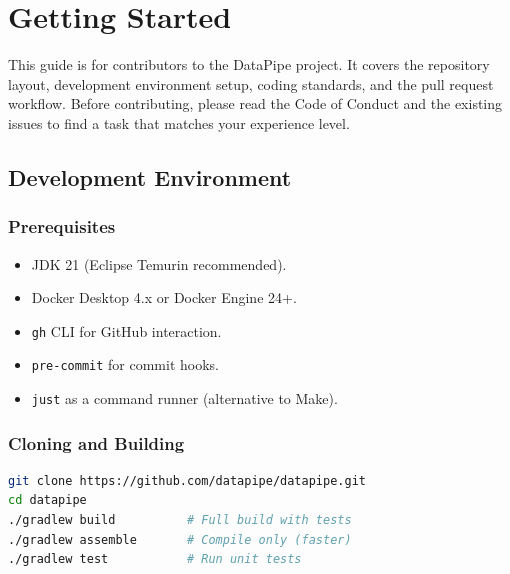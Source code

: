 \documentclass[
    language=english,
    doctype=manual,
    institution=none,
    titlestyle=book,
    oneside,
]{../../omnilatex}
\begin{document}
\maketitle

\tableofcontents

\chapter{Getting Started}
\label{sec:getting-started}

This guide is for contributors to the DataPipe project. It covers the
repository layout, development environment setup, coding standards, and
the pull request workflow. Before contributing, please read the Code of
Conduct and the existing issues to find a task that matches your
experience level.

\section{Development Environment}

\subsection{Prerequisites}

\begin{itemize}
    \item JDK 21 (Eclipse Temurin recommended).
    \item Docker Desktop 4.x or Docker Engine 24+.
    \item \texttt{gh} CLI for GitHub interaction.
    \item \texttt{pre-commit} for commit hooks.
    \item \texttt{just} as a command runner (alternative to Make).
\end{itemize}

\subsection{Cloning and Building}

\begin{lstlisting}[language=bash, caption={Repository setup and first build.}]
git clone https://github.com/datapipe/datapipe.git
cd datapipe
./gradlew build          # Full build with tests
./gradlew assemble       # Compile only (faster)
./gradlew test           # Run unit tests
\end{lstlisting}
\end{document}
